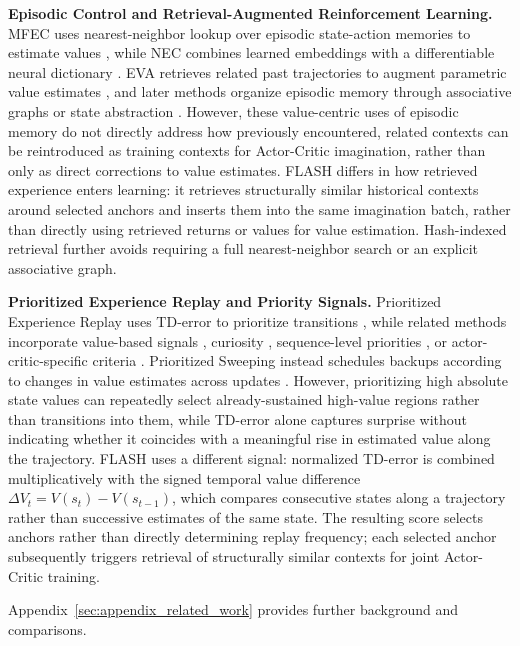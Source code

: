 \documentclass{article} %
\begin{document}
\textbf{Episodic Control and Retrieval-Augmented Reinforcement Learning.}
MFEC uses nearest-neighbor lookup over episodic state-action memories to estimate values \citep{blundell2016model}, while NEC combines learned embeddings with a differentiable neural dictionary \citep{pritzel2017neural}. EVA retrieves related past trajectories to augment parametric value estimates \citep{hansen2018fast}, and later methods organize episodic memory through associative graphs or state abstraction \citep{zhu2020episodic, li2023neural}. However, these value-centric uses of episodic memory do not directly address how previously encountered, related contexts can be reintroduced as training contexts for Actor-Critic imagination, rather than only as direct corrections to value estimates. FLASH differs in how retrieved experience enters learning: it retrieves structurally similar historical contexts around selected anchors and inserts them into the same imagination batch, rather than directly using retrieved returns or values for value estimation. Hash-indexed retrieval further avoids requiring a full nearest-neighbor search or an explicit associative graph.

\textbf{Prioritized Experience Replay and Priority Signals.}
Prioritized Experience Replay uses TD-error to prioritize transitions \citep{schaul2015prioritized}, while related methods incorporate value-based signals \citep{cao2019high}, curiosity \citep{kauvar2023curious}, sequence-level priorities \citep{karimpanal2018experience, brittain2019prioritized}, or actor-critic-specific criteria \citep{saglam2023actor}. Prioritized Sweeping instead schedules backups according to changes in value estimates across updates \citep{moore1993prioritized}. However, prioritizing high absolute state values can repeatedly select already-sustained high-value regions rather than transitions into them, while TD-error alone captures surprise without indicating whether it coincides with a meaningful rise in estimated value along the trajectory. FLASH uses a different signal: normalized TD-error is combined multiplicatively with the signed temporal value difference $\Delta V_t = V(s_t)-V(s_{t-1})$, which compares consecutive states along a trajectory rather than successive estimates of the same state. The resulting score selects anchors rather than directly determining replay frequency; each selected anchor subsequently triggers retrieval of structurally similar contexts for joint Actor-Critic training.

Appendix~\ref{sec:appendix_related_work} provides further background and comparisons.
\end{document}
